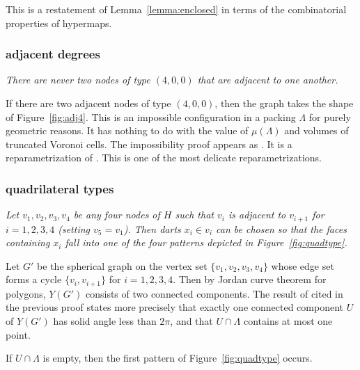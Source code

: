This is a restatement of Lemma~\ref{lemma:enclosed} in terms of the combinatorial
properties of hypermaps.


\subsubsection{adjacent degrees}

{\it There are never two nodes of type $(4,0,0)$ that are adjacent to one another.}

If there are two adjacent nodes of type $(4,0,0)$, then the graph takes the
shape of Figure~\ref{fig:adj4}.  This is an impossible configuration in a packing $\Lambda$
for purely geometric reasons.  It has nothing to do with the value of $\mu(\Lambda)$
and volumes of truncated Voronoi cells.
The impossibility proof appears as \cite[Lemma~3.8]{arx}. It is a reparametrization
of \cite[Prop.4.2]{Part1}.  This is one of the most delicate reparametrizations.

\begin{floatingfigure}{30mm}
  \begin{center}
   \end{center}
  \caption{}
\label{fig:adj4}
\end{floatingfigure}


\subsubsection{quadrilateral types}


{\it Let $v_1,v_2,v_3,v_4$ be any four nodes of $H$ such that $v_i$ is adjacent
to $v_{i+1}$ for $i=1,2,3,4$ (setting $v_5=v_1$).  Then darts $x_i\in v_i$ can be chosen
so that the faces containing $x_i$ fall into one of the four patterns depicted
in Figure~\ref{fig:quadtype}.}

Let $G'$ be the spherical graph on the vertex set $\{v_1,v_2,v_3,v_4\}$
whose edge set forms a cycle $\{v_i,v_{i+1}\}$ for $i=1,2,3,4$.  Then by
Jordan curve theorem for polygons, $Y(G')$ consists of two connected components.
The result of \cite[Lemma~3.8]{arx} cited in the previous proof states more precisely
that exactly one connected component $U$ of $Y(G')$ has solid angle less than $2\pi$,
and that $U\cap\Lambda$ contains at most one point.

If $U\cap\Lambda$ is empty, then the first pattern of Figure~\ref{fig:quadtype} occurs.


